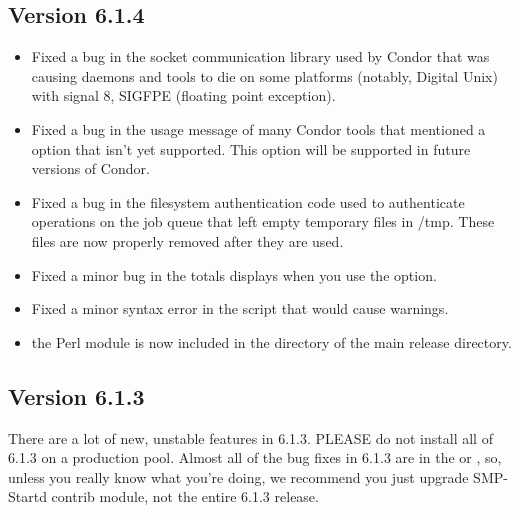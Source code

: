 \subsection{\label{sec:New-6-1-4}Version 6.1.4}

\begin{itemize}

\item Fixed a bug in the socket communication library used by Condor
that was causing daemons and tools to die on some platforms (notably,
Digital Unix) with signal 8, SIGFPE (floating point exception).

\item Fixed a bug in the usage message of many Condor tools that
mentioned a  option that isn't yet supported. 
This option will be supported in future versions of Condor.

\item Fixed a bug in the filesystem authentication code used to
authenticate operations on the job queue that left empty temporary
files in /tmp.  
These files are now properly removed after they are used.

\item Fixed a minor bug in the totals  displays when
you use the  option.

\item Fixed a minor syntax error in the  script that
would cause warnings.

\item the  Perl module is now included in the
 directory of the main release directory.

\end{itemize}

\subsection{\label{sec:New-6-1-3}Version 6.1.3}

\Note There are a lot of new, unstable features in 6.1.3.  
PLEASE do not install all of 6.1.3 on a production pool.
Almost all of the bug fixes in 6.1.3 are in the  or
, so, unless you really know what you're doing, we
recommend you just upgrade SMP-Startd contrib module, not the entire
6.1.3 release. 


